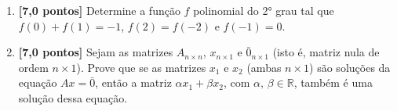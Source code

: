 \documentclass[12pt,a4paper]{article}
\begin{document}
\begin{enumerate}
  \item \textbf{[7,0 pontos]} Determine a função $f$ polinomial do 2° grau tal
    que $f(0) + f(1) = -1$, $f(2) = f(-2)$ e $f(-1) = 0$.
    
  \item \textbf{[7,0 pontos]} Sejam as matrizes $A_{n\times n}$, $x_{n\times 1}$ e 
    $\bar{0}_{n\times 1}$ (isto é, matriz nula de ordem $n\times 1$).
    Prove que se as matrizes $x_1$ e $x_2$ (ambas $n\times 1$) são
    soluções da equação $Ax = \bar{0}$, então a matriz $\alpha x_1 + \beta x_2$,
    com $\alpha,\,\beta\in\mathbb{R}$, também é uma solução dessa equação.

  \end{enumerate}
\end{document}

